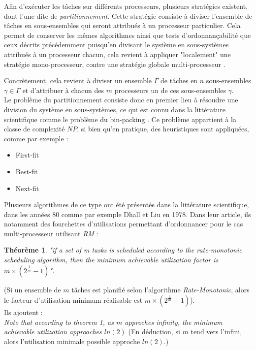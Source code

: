 \documentclass[11pt,a4paper,oneside]{report}
\newtheorem{mytheorem}{Théorème}
\begin{document}
Afin d'exécuter les tâches sur différents processeurs, plusieurs stratégies existent, 
dont l'une dite de \textit{partitionnement}. 
Cette stratégie consiste à diviser l'ensemble de tâches en sous-ensembles qui seront 
attribués à un processeur particulier. Cela permet de conserver les mêmes algorithmes ainsi 
que tests d'ordonnançabilité que ceux 
décrits précédemment puisqu'en divisant le système en sous-systèmes attribués à un 
processeur chacun, cela revient à appliquer "localement" une stratégie mono-processeur, contre 
une stratégie globale multi-processeur \cite{ndoye_ordonnancement_2014}.

Concrètement, cela revient à diviser un ensemble $\Gamma$ de tâches en $n$ sous-ensembles 
$\gamma \in \Gamma$ et d'attribuer à chacun des $m$ processeurs un de ces sous-ensembles $\gamma$.\\


Le problème du partitionnement consiste donc en premier lieu 
à résoudre une division du système en sous-systèmes, ce qui est connu dans la 
littérature scientifique comme le problème du bin-packing \cite{ausiello_approximation_1984}.
Ce problème appartient à la classe de complexité $NP$, si bien qu'en pratique, 
des heuristiques sont appliquées, comme par exemple :\\
\begin{itemize}
	\item First-fit 
	\item Best-fit
	\item Next-fit
\end{itemize}

Plusieurs algorithmes de ce type ont été présentés dans la littérature scientifique, 
dans les années 80 comme par exemple \cite{dhall_real-time_1978} Dhall et Liu en 1978. 
Dans leur article, ils notamment des fourchettes d'utilisations 
permettant d'ordonnancer pour le cas multi-processeur utilisant \textit{RM} :
\begin{mytheorem}
\textit{"if a set of m tasks is scheduled according to the rate-monotonic scheduling algorithm, then the minimum achievable utilization factor is $m\times(2^{\frac{1}{m}} - 1)$".}
\end{mytheorem}
(Si un ensemble de $m$ tâches est planifié selon l'algorithme \textit{Rate-Monotonic}, 
alors le facteur d'utilisation minimum réalisable est $m\times(2^{\frac{1}{m}} - 1)$). \\
Ils ajoutent :\\
\textit{Note that according to theorem 1, as $m$ approches infinity, 
	the minimum achievable utilization approaches $ln(2)$}
(En déduction, si $m$ tend vers l'infini, alors l'utilisation minimale possible approche $ln(2)$.) \\
\end{document}
